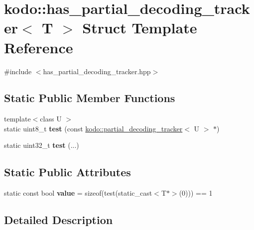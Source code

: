\hypertarget{structkodo_1_1has__partial__decoding__tracker}{\section{kodo\-:\-:has\-\_\-partial\-\_\-decoding\-\_\-tracker$<$ T $>$ Struct Template Reference}
\label{structkodo_1_1has__partial__decoding__tracker}
}


{\ttfamily \#include $<$has\-\_\-partial\-\_\-decoding\-\_\-tracker.\-hpp$>$}

\subsection*{Static Public Member Functions}
\begin{DoxyCompactItemize}
\item 
\hypertarget{structkodo_1_1has__partial__decoding__tracker_a7490082533bb07380e72934b4e91578d}{{\footnotesize template$<$class U $>$ }\\static uint8\-\_\-t {\bfseries test} (const \hyperlink{classkodo_1_1partial__decoding__tracker}{kodo\-::partial\-\_\-decoding\-\_\-tracker}$<$ U $>$ $\ast$)}\label{structkodo_1_1has__partial__decoding__tracker_a7490082533bb07380e72934b4e91578d}

\item 
\hypertarget{structkodo_1_1has__partial__decoding__tracker_af3602a6722cee81c0c970cdf76040ded}{static uint32\-\_\-t {\bfseries test} (...)}\label{structkodo_1_1has__partial__decoding__tracker_af3602a6722cee81c0c970cdf76040ded}

\end{DoxyCompactItemize}
\subsection*{Static Public Attributes}
\begin{DoxyCompactItemize}
\item 
\hypertarget{structkodo_1_1has__partial__decoding__tracker_a7bf4bf594b0922d1da618212c183a437}{static const bool {\bfseries value} = sizeof(test(static\-\_\-cast$<$T$\ast$$>$(0))) == 1}\label{structkodo_1_1has__partial__decoding__tracker_a7bf4bf594b0922d1da618212c183a437}

\end{DoxyCompactItemize}


\subsection{Detailed Description}

